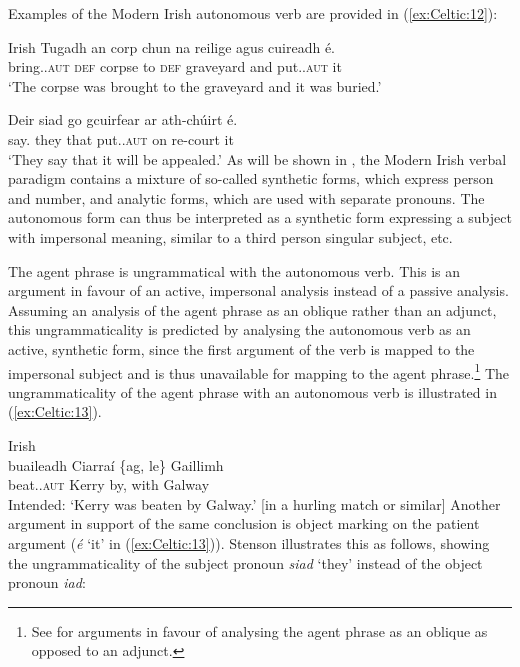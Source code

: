 \documentclass[output=paper,colorlinks,citecolor=brown]{langscibook}
\begin{document}
Examples of the Modern Irish autonomous verb are provided in (\ref{ex:Celtic:12}):

\ea\label{ex:Celtic:12} Irish
\ea\gll Tugadh  an corp  chun na reilige agus cuireadh  \'e.\\
bring.\PST.\textsc{aut} \textsc{def} corpse to \textsc{def} graveyard and put.\PST.\textsc{aut} it\\
\glt`The corpse was brought to the graveyard and it was buried.' \citep[4]{Graver2010}

\ex
\gll Deir siad go gcuirfear ar ath-chúirt \'e.\\
{say.\PRS} they that put.\FUT.\textsc{aut} on re-court it\\
\glt`They say that it will be appealed.' \citep[9]{Graver2010}
\z\z
As will be shown in , the Modern Irish verbal paradigm contains a mixture of so-called synthetic forms, which express person and number, and analytic forms, which are used with separate pronouns. The autonomous form can thus be interpreted as a synthetic form expressing a subject with impersonal meaning, similar to a third person singular subject, etc.

The agent phrase is ungrammatical with the autonomous verb. This is an argument in favour of an active, impersonal analysis instead of a passive analysis. Assuming an analysis of the agent phrase as an oblique rather than an adjunct, this ungrammaticality is predicted by analysing the autonomous verb as an active, synthetic form, since the first argument of the verb is mapped to the impersonal subject and is thus unavailable for mapping to the agent phrase.\footnote{See \citet[60--61 and references therein]{Graver2010} for arguments in favour of analysing the agent phrase as an oblique as opposed to an adjunct.} The ungrammaticality of the agent phrase with an autonomous verb is illustrated in (\ref{ex:Celtic:13}).

\ea\label{ex:Celtic:13} Irish \citep[382]{Stenson1989}\\
\gll *buaileadh  Ciarraí \{ag, le\} Gaillimh\\
beat.\PST.\textsc{aut} Kerry \phantom{\{}by, with Galway\\
\glt Intended: `Kerry was beaten by Galway.' [in a hurling match or similar]
\z
Another argument in support of the same conclusion is object marking on the patient argument (\emph{\'e} `it' in (\ref{ex:Celtic:13})). Stenson illustrates this as follows, showing the ungrammaticality of the subject pronoun \emph{siad} `they' instead of the object pronoun \emph{iad}:
\end{document}
